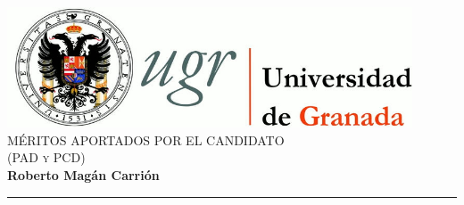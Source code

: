 \begin{titlepage}
 
 
\newlength{\centeroffset}
\setlength{\centeroffset}{-0.5\oddsidemargin}
\addtolength{\centeroffset}{0.5\evensidemargin}
\thispagestyle{empty}

\noindent\hspace*{\centeroffset}\begin{minipage}{\textwidth}

\centering
\includegraphics[width=0.9\textwidth]{imagenes/logo_ugr.jpg}\\[1.4cm]

\textsc{ \Large MÉRITOS APORTADOS POR EL CANDIDATO\\[0.2cm]}
\textsc{(PAD y PCD)}\\[0.5cm]
% 
{\Huge\bfseries Roberto Magán Carrión\\
}
\noindent\rule[-1ex]{\textwidth}{2pt}\\[1ex]

\end{minipage}

\vspace{2cm}
\noindent\hspace*{\centeroffset}\begin{minipage}{\textwidth}
\centering



\end{minipage}
\end{titlepage}
